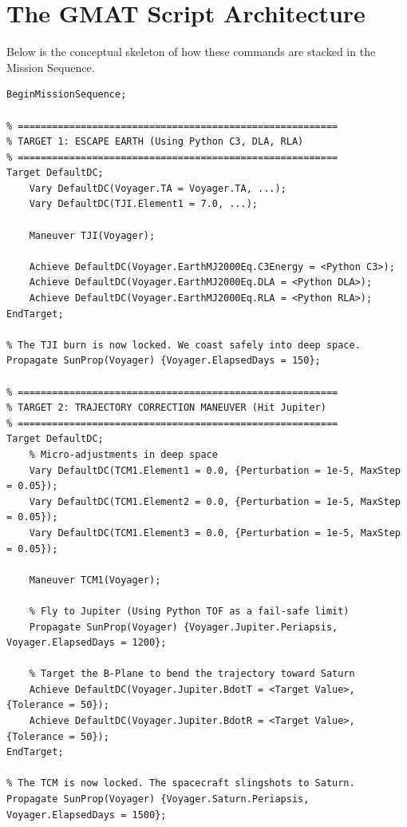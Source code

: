 \documentclass[11pt, letterpaper]{article}
\begin{document}
\section*{The GMAT Script Architecture}

Below is the conceptual skeleton of how these commands are stacked in the Mission Sequence.

\begin{lstlisting}
BeginMissionSequence;

% ========================================================
% TARGET 1: ESCAPE EARTH (Using Python C3, DLA, RLA)
% ========================================================
Target DefaultDC;
    Vary DefaultDC(Voyager.TA = Voyager.TA, ...);
    Vary DefaultDC(TJI.Element1 = 7.0, ...);
    
    Maneuver TJI(Voyager);
    
    Achieve DefaultDC(Voyager.EarthMJ2000Eq.C3Energy = <Python C3>);
    Achieve DefaultDC(Voyager.EarthMJ2000Eq.DLA = <Python DLA>);
    Achieve DefaultDC(Voyager.EarthMJ2000Eq.RLA = <Python RLA>);
EndTarget;

% The TJI burn is now locked. We coast safely into deep space.
Propagate SunProp(Voyager) {Voyager.ElapsedDays = 150};

% ========================================================
% TARGET 2: TRAJECTORY CORRECTION MANEUVER (Hit Jupiter)
% ========================================================
Target DefaultDC;
    % Micro-adjustments in deep space
    Vary DefaultDC(TCM1.Element1 = 0.0, {Perturbation = 1e-5, MaxStep = 0.05});
    Vary DefaultDC(TCM1.Element2 = 0.0, {Perturbation = 1e-5, MaxStep = 0.05});
    Vary DefaultDC(TCM1.Element3 = 0.0, {Perturbation = 1e-5, MaxStep = 0.05});
    
    Maneuver TCM1(Voyager);
    
    % Fly to Jupiter (Using Python TOF as a fail-safe limit)
    Propagate SunProp(Voyager) {Voyager.Jupiter.Periapsis, Voyager.ElapsedDays = 1200};
    
    % Target the B-Plane to bend the trajectory toward Saturn
    Achieve DefaultDC(Voyager.Jupiter.BdotT = <Target Value>, {Tolerance = 50});
    Achieve DefaultDC(Voyager.Jupiter.BdotR = <Target Value>, {Tolerance = 50});
EndTarget;

% The TCM is now locked. The spacecraft slingshots to Saturn.
Propagate SunProp(Voyager) {Voyager.Saturn.Periapsis, Voyager.ElapsedDays = 1500};
\end{lstlisting}
\end{document}
